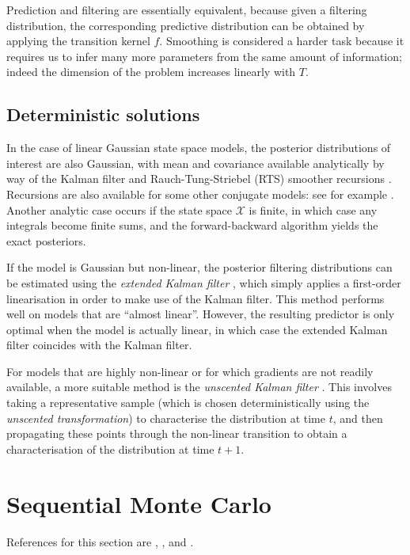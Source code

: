 \documentclass[fleqn]{article}
\theoremstyle{definition}
\begin{document}
Prediction and filtering are essentially equivalent, because given a filtering distribution, the corresponding predictive distribution can be obtained by applying the transition kernel $f$.
Smoothing is considered a harder task because it requires us to infer many more parameters from the same amount of information; indeed the dimension of the problem increases linearly with $T$.

\subsection{Deterministic solutions}
In the case of linear Gaussian state space models, the posterior distributions of interest are also Gaussian, with mean and covariance available analytically by way of the Kalman filter \citep{kalman1960} and Rauch-Tung-Striebel (RTS) smoother recursions \citep{rauch1965}. Recursions are also available for some other conjugate models: see for example \citet{vidoni1999}.
Another analytic case occurs if the state space $\mathcal{X}$ is finite, in which case any integrals become finite sums, and the forward-backward algorithm \citep{baum1970} yields the exact posteriors.

If the model is Gaussian but non-linear, the posterior filtering distributions can be estimated using the \emph{extended Kalman filter} \citep{jazwinski2007}, which simply applies a first-order linearisation in order to make use of the Kalman filter. This method performs well on models that are ``almost linear''. However, the resulting predictor is only optimal when the model is actually linear, in which case the extended Kalman filter coincides with the Kalman filter.

For models that are highly non-linear or for which gradients are not readily available, a more suitable method is the \emph{unscented Kalman filter} \citep{wan2000}. This involves taking a representative sample (which is chosen deterministically using the \emph{unscented transformation}) to characterise the distribution at time $t$, and then propagating these points through the non-linear transition to obtain a characterisation of the distribution at time $t+1$.


\section{Sequential Monte Carlo}\label{sec:SMC}
References for this section are \citet{doucet2001}, \citet{delmoral2006}, and \citet{doucet2009}.
\end{document}
